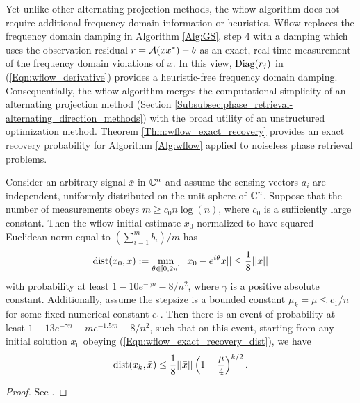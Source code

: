 Yet unlike other alternating projection methods, the wflow algorithm does not require additional frequency domain information or heuristics.  Wflow replaces the frequency domain damping in Algorithm \ref{Alg:GS}, step 4 with a damping which uses the observation residual $r = {\mathcal A}(xx^*) - b$ as an exact, real-time measurement of the frequency domain violations of $x$.  In this view, $\textnormal{Diag}(r_j)$ in (\ref{Eqn:wflow_derivative}) provides a heuristic-free frequency domain damping.  Consequentially, the wflow algorithm merges the computational simplicity of an alternating projection method (Section  \ref{Subsubsec:phase_retrieval-alternating_direction_methods}) with the broad utility of an unstructured optimization method.  Theorem \ref{Thm:wflow_exact_recovery} provides an exact recovery probability for Algorithm \ref{Alg:wflow} applied to noiseless phase retrieval problems.

\begin{theorem} 			\label{Thm:wflow_exact_recovery}
Consider an arbitrary signal $\bar{x}$ in ${\mathbb C}^n$ and assume the sensing vectors $a_i$ are independent, uniformly distributed on the unit sphere of ${\mathbb C}^n$.  Suppose that the number of measurements obeys $m \geq c_0 n \log(n)$, where $c_0$ is a sufficiently large constant.  Then the wflow initial estimate $x_0$ normalized to have squared Euclidean norm equal to $(\sum_{i=1}^m b_i)/m$ has
\begin{equation} 			\label{Eqn:wflow_exact_recovery_dist}
\operatorname{dist}(x_0, \bar{x}) := \min\limits_{\theta \in [0, 2\pi]} ||x_0 - e^{i \theta}\bar{x} || \leq \frac{1}{8}||x||
\end{equation}
with probability at least $1 - 10e^{-\gamma n} - 8/n^2$, where $\gamma$ is a positive absolute constant.  Additionally, assume the stepsize is a bounded constant $\mu_k = \mu \leq c_1/n$ for some fixed numerical constant $c_1$.  Then there is an event of probability at least $1 - 13e^{- \gamma n} - me^{-1.5m} - 8/n^2$, such that on this event, starting from any initial solution $x_0$ obeying (\ref{Eqn:wflow_exact_recovery_dist}), we have
\begin{equation} 			\label{Eqn:wflow_exact_recovery_rate}
\operatorname{dist}(x_k, \bar{x}) \leq \frac{1}{8} ||\bar{x}|| \left( 1 - \frac{\mu}{4} \right)^{k / 2}.
\end{equation}
\end{theorem}
\begin{proof}
See \cite[Section 7]{DBLP:journals/tit/CandesLS15}.
\end{proof}

